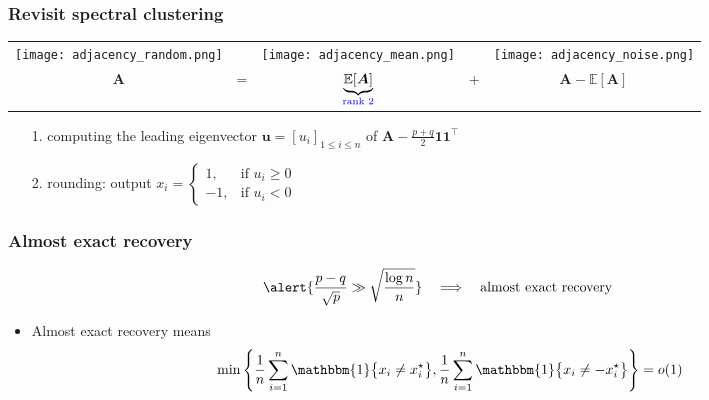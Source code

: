 \documentclass[compress,
mathserif,wide,%
]{beamer}
\begin{document}
\begin{frame}
\end{frame}



\begin{frame}
\frametitle{Revisit spectral clustering}

		
\begin{center}
\begin{tabular}{ccccc}
\texttt{[image: adjacency\_random.png]} &   & \texttt{[image: adjacency\_mean.png]} &  & \texttt{[image: adjacency\_noise.png]}\tabularnewline
	$\bm{A}$ & = & $\underset{\textcolor{blue}{ \text{rank 2}}}{\underbrace{\mathbb{E}[\bm{A}]}}$ & + & $\bm{A}-\mathbb{E}\left[\bm{A}\right]$\tabularnewline
\end{tabular}
\end{center}

\vspace{-0.5em}
\begin{itemize}
	\item[{\color{black}1.}] computing the leading eigenvector $\bm{u}=[u_i]_{1\leq i\leq n}$ of $\bm{A} - \frac{p+q}{2}\bm{1}\bm{1}^{\top}$
	\item[{\color{black}2.}] rounding:  output
		${x}_{i}=\begin{cases}
			1, & \text{if }u_{i} \geq 0\\
			-1, & \text{if }u_{i}<0
\end{cases}$
\end{itemize}

\end{frame}



\begin{frame}
\frametitle{Almost exact recovery}

\[
	\alert{\frac{p-q}{\sqrt{p}}\gg \sqrt{\frac{\log n}{n}}} \quad \Longrightarrow \quad \text{almost exact recovery} 
\]

\vfill 
\begin{itemize}
	\item Almost exact recovery means
	\[
	\min \left \{ \frac{1}{n}\sum_{i=1}^{n} \mathbbm{1} \big\{ x_{i}\neq x_{i}^{\star}\big\},  \frac{1}{n}\sum_{i=1}^{n} \mathbbm{1} \big\{ x_{i}\neq -x_{i}^{\star}\big\} \right \} = o(1)
	\]
\end{itemize}
\end{frame}
\end{document}
